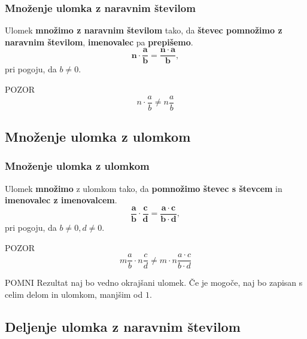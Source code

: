         \begin{frame}[t]
            \frametitle{Množenje ulomka z naravnim številom}

            \begin{alertblock}{}
                Ulomek \textbf{množimo z naravnim številom} tako, da \textbf{števec pomnožimo z naravnim številom}, \textbf{imenovalec} pa \textbf{prepišemo}.
                $$ \mathbf{n\cdot\frac{a}{b}=\frac{n\cdot a}{b}}, $$ pri pogoju, da $b\neq 0$.
            \end{alertblock}        
            
            \begin{exampleblock}{POZOR}
                $$ n\cdot\frac{a}{b}\neq n\frac{a}{b} $$
            \end{exampleblock}
        \end{frame}


    \subsection{Množenje ulomka z ulomkom}

        \begin{frame}[t]
            \frametitle{Množenje ulomka z ulomkom}

            \begin{alertblock}{}
                Ulomek \textbf{množimo} z ulomkom tako, da \textbf{pomnožimo števec s števcem} in \textbf{imenovalec z imenovalcem}.
                $$ \mathbf{\frac{a}{b}\cdot\frac{c}{d}=\frac{a\cdot c}{b\cdot d}}, $$ pri pogoju, da $b\neq 0, d\neq 0$.
            \end{alertblock}

            \begin{exampleblock}{POZOR}
                $$ m\frac{a}{b}\cdot n\frac{c}{d}\neq m\cdot n\frac{a\cdot c}{b\cdot d} $$
            \end{exampleblock}

            \begin{block}{POMNI}
                Rezultat naj bo vedno okrajšani ulomek. Če je mogoče, naj bo zapisan s celim delom  in ulomkom, manjšim od $1$.
            \end{block}

        \end{frame}

    \subsection{Deljenje ulomka z naravnim številom}

